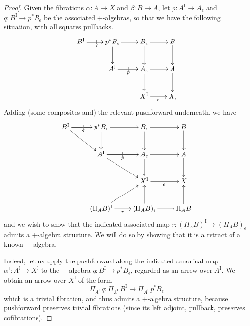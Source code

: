 \documentclass[11pt]{article}
\makeatletter
\newcommand{\pbcorner}[1][dr]{\save*!/#1-1.2pc/#1:(-1,1)@^{|-}\restore}
\newcommand{\ra}{\ensuremath{\rightarrow}}
\newcommand{\I}{\ensuremath{\mathrm{I}}}
\theoremstyle{remark}
\theoremstyle{definition}
\makeatother
\begin{document}
\begin{proof}
Given the fibrations $\alpha : A \ra X$ and $\beta: B\ra A$, let $p : A^\I \ra A_\epsilon$ and $q : B^\I \ra p^*B_\epsilon$ be the associated +-algebras, so that we have the following situation, with all squares pullbacks.
\begin{equation}\label{diagram:frobenius1}
\xymatrix{
B^\I \ar[r]|| \ar[r]_{q}   & p^*B_\epsilon \ar[r]  \ar[d]  & B_{\epsilon}  \ar[d]   \ar[r] & B \ar[d]\\
&A^\I \ar[r]|| \ar[r]_{p}  & A_{\epsilon} \ar[d]   \ar[r] & A \ar[d]\\
&& X^\I \ar[r]_{\epsilon} &  X,
}
\end{equation}
Adding (some composites and) the relevant pushforward underneath, we have
 \begin{equation}\label{diagram:frobenius2}
\xymatrix{
B^\I \ar[r]|| \ar[r]_{q} \ar[rd]  & p^*B_\epsilon \ar[r]  \ar[d]  & B_{\epsilon}  \ar[d]   \ar[r] & B \ar[d] \\
& A^\I \ar[r]|| \ar[r]_{p} \ar[rd]  & A_{\epsilon} \ar[d]   \ar[r] & A \ar[d] \\
&& X^\I \ar[r]_{\epsilon} &  X \\
& (\Pi_AB)^\I  \ar[r]_r  \ar[ru] & (\Pi_AB)_\epsilon  \ar[u] \ar[r] & \Pi_AB \ar[u]
}
\end{equation}
and we wish to show that the indicated associated map $r : (\Pi_AB)^\I \to (\Pi_AB)_\epsilon$
 admits a +-algebra structure. We will do so by showing that it is a retract of a known +-algebra.

Indeed, let us apply the pushforward along the indicated canonical map $\alpha^\I:A^\I \ra X^\I$ to the +-algebra $q : B^\I \ra p^*B_\epsilon$, regarded as an arrow over $A^\I$.  We obtain an arrow over $X^\I$ of the form
\[
\Pi_{A^\I}\,q :  \Pi_{A^\I}\,B^\I \to \Pi_{A^\I}\,p^*B_\epsilon
\]
which is a trivial fibration, and thus admits a +-algebra structure, because pushforward preserves trivial fibrations (since its left adjoint, pullback, preserves cofibrations).


\end{proof}
\end{document}
